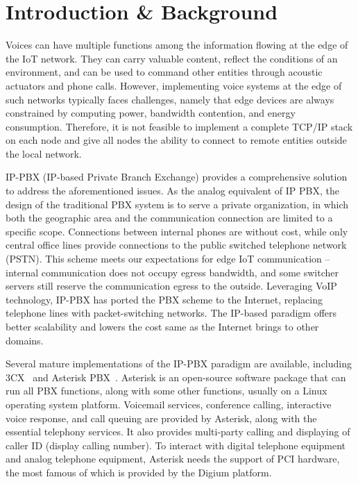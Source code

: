 \section{Introduction \& Background}	
\label{sec:introduction-background}
Voices can have multiple functions among the information flowing at the edge of the IoT network. They can carry valuable content, reflect the conditions of an environment, and can be used to command other entities through acoustic actuators and phone calls. However, implementing voice systems at the edge of such networks typically faces challenges, namely that edge devices are always constrained by computing power, bandwidth contention, and energy consumption. Therefore, it is not feasible to implement a complete TCP/IP stack on each node and give all nodes the ability to connect to remote entities outside the local network.

IP-PBX (IP-based Private Branch Exchange) provides a comprehensive solution to address the aforementioned issues. As the analog equivalent of IP PBX, the design of the traditional PBX system is to serve a private organization, in which both the geographic area and the communication connection are limited to a specific scope. Connections between internal phones are without cost, while only central office lines provide connections to the public switched telephone network (PSTN). This scheme meets our expectations for edge IoT communication -- internal communication does not occupy egress bandwidth, and some switcher servers still reserve the communication egress to the outside. Leveraging VoIP technology, IP-PBX has ported the PBX scheme to the Internet, replacing telephone lines with packet-switching networks. The IP-based paradigm offers better scalability and lowers the cost same as the Internet brings to other domains. 

Several mature implementations of the IP-PBX paradigm are available, including 3CX~\cite{3cx_2022} and Asterisk PBX~\cite{sangoma-technologies}. Asterisk is an open-source software package that can run all PBX functions, along with some other functions, usually on a Linux operating system platform. Voicemail services, conference calling, interactive voice response, and call queuing are provided by Asterisk, along with the essential telephony services. It also provides multi-party calling and displaying of caller ID (display calling number). To interact with digital telephone equipment and analog telephone equipment, Asterisk needs the support of PCI hardware, the most famous of which is provided by the Digium platform. 

